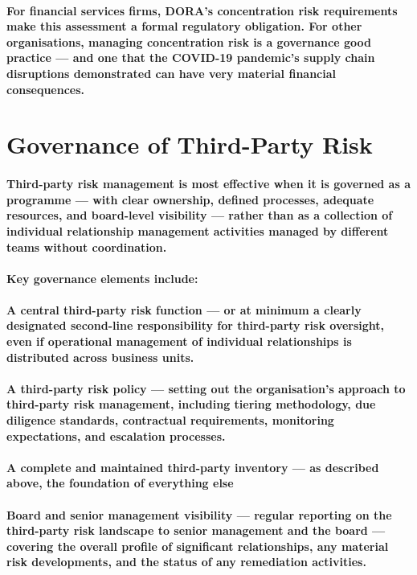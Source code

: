 \paragraph{For financial services firms, DORA's concentration risk requirements make this assessment a formal regulatory obligation. For other organisations, managing concentration risk is a governance good practice — and one that the COVID-19 pandemic's supply chain disruptions demonstrated can have very material financial consequences.}

\section{Governance of Third-Party Risk}
\paragraph{Third-party risk management is most effective when it is governed as a programme — with clear ownership, defined processes, adequate resources, and board-level visibility — rather than as a collection of individual relationship management activities managed by different teams without coordination.}
\paragraph{Key governance elements include:}
\paragraph{\textbf{A central third-party risk function — or at minimum a clearly designated second-line responsibility for third-party risk oversight, even if operational management of individual relationships is distributed across business units.}}
\paragraph{\textbf{A third-party risk policy} — setting out the organisation's approach to third-party risk management, including tiering methodology, due diligence standards, contractual requirements, monitoring expectations, and escalation processes.}
\paragraph{\textbf{A complete and maintained third-party inventory} — as described above, the foundation of everything else}
\paragraph{\textbf{Board and senior management visibility} — regular reporting on the third-party risk landscape to senior management and the board — covering the overall profile of significant relationships, any material risk developments, and the status of any remediation activities.}
